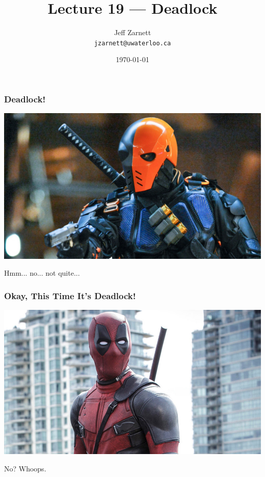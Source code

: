 

\title{Lecture 19 --- Deadlock }

\author{Jeff Zarnett \\ \small \texttt{jzarnett@uwaterloo.ca}}
\date{\today}




\begin{frame}
  \titlepage

 \end{frame}


\begin{frame}
\frametitle{Deadlock!}

\begin{center}
	\includegraphics[width=\textwidth]{images/deathstroke.jpg}
\end{center}

Hmm... no... not quite...

\end{frame}


\begin{frame}
\frametitle{Okay, This Time It's Deadlock!}

\begin{center}
	\includegraphics[width=\textwidth]{images/deadpool.jpg}
\end{center}

No? Whoops.

\end{frame}


